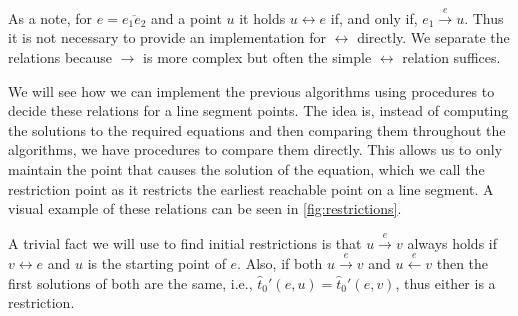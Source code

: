 As a note, for \(e = \overline{e_1e_2}\) and a point \(u\) it holds \(u \leftrightarrow e\) if, and only if, \(e_1 \overset{e}\rightarrow u\). Thus it is not necessary to provide an implementation for \(\leftrightarrow\) directly. We separate the relations because \(\rightarrow\) is more complex but often the simple \(\leftrightarrow\) relation suffices.

We will see how we can implement the previous algorithms using procedures to decide these relations for a line segment points. The idea is, instead of computing the solutions to the required equations and then comparing them throughout the algorithms, we have procedures to compare them directly. This allows us to only maintain the point that causes the solution of the equation, which we call the restriction point as it restricts the earliest reachable point on a line segment. A visual example of these relations can be seen in \cref{fig:restrictions}.

A trivial fact we will use to find initial restrictions is that \(u \overset e\rightarrow v\) always holds if \(v \leftrightarrow e\) and \(u\) is the starting point of \(e\). Also, if both \(u \overset e\rightarrow v\) and \(u \overset e\leftarrow v\) then the first solutions of both are the same, i.e., \(\hat t_0'(e, u) = \hat t_0'(e,v)\), thus either is a restriction. 

